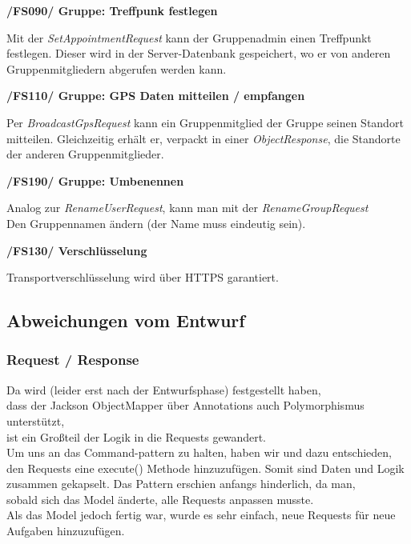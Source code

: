 \textbf{/FS090/ Gruppe: Treffpunk festlegen}

Mit der \textit{SetAppointmentRequest} kann der Gruppenadmin einen Treffpunkt festlegen.
Dieser wird in der Server-Datenbank gespeichert, wo er von anderen Gruppenmitgliedern
abgerufen werden kann.


\textbf{/FS110/ Gruppe: GPS Daten mitteilen / empfangen}

Per \textit{BroadcastGpsRequest} kann ein Gruppenmitglied der Gruppe seinen Standort
mitteilen. Gleichzeitig erhält er, verpackt in einer \textit{ObjectResponse},
die Standorte der anderen Gruppenmitglieder.

\textbf{/FS190/ Gruppe: Umbenennen}

Analog zur \textit{RenameUserRequest}, kann man mit der \textit{RenameGroupRequest}\\
Den Gruppennamen ändern (der Name muss eindeutig sein).

\textbf{/FS130/ Verschlüsselung}

Transportverschlüsselung wird über HTTPS garantiert.

\subsection{Abweichungen vom Entwurf}

\subsubsection{Request / Response}

Da wird (leider erst nach der Entwurfsphase) festgestellt haben, \\
dass der Jackson ObjectMapper über Annotations auch Polymorphismus unterstützt,\\
ist ein Großteil der Logik in die Requests gewandert.\\
Um uns an das Command-pattern zu halten, haben wir und dazu entschieden, \\
den Requests eine execute() Methode hinzuzufügen. Somit sind Daten und Logik \\
zusammen gekapselt. Das Pattern erschien anfangs hinderlich, da man,\\
sobald sich das Model änderte, alle Requests anpassen musste.\\
Als das Model jedoch fertig war, wurde es sehr einfach, neue Requests für neue\\
Aufgaben hinzuzufügen.\\

